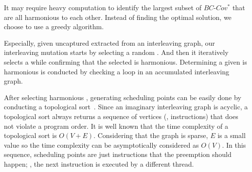 It may require heavy computation to identify the largest subset of
$BC\mbox{-}Cov^*$ that are all harmonious to each other.
%
Instead of finding the optimal solution, we choose to use a greedy
algorithm.
%


Especially, given uncaptured \segments extracted from an interleaving
graph, our interleaving mutation starts by selecting a random
\segment.
%
And then it iteratively selects a \segment while confirming that the
selected \segment is harmonious.
%
Determining a given \segment is harmonious is conducted by checking a
loop in an accumulated interleaving graph.



%
After selecting harmonious \segments, generating scheduling points can
be easily done by conducting a topological
sort~\cite{topologicalsort}.
%
Since an imaginary interleaving graph is acyclic, a topological sort
always returns a sequence of vertices (\ie, instructions) that does
not violate a program order.
%
It is well known that the time complexity of a topological sort is
$O(V+E)$. Considering that the graph is sparse, $E$ is a small value
so the time complexity can be asymptotically considered as $O(V)$.
%
In this sequence, scheduling points are just instructions that the
preemption should happen; \ie, the next instruction is executed by a
different thread.
%



